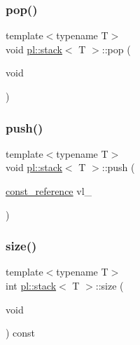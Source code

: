 \mbox{\label{classpl_1_1stack_aee95f572e71eeebc97a4d5543d500886}} 
\subsubsection{\texorpdfstring{pop()}{pop()}}
{\footnotesize\ttfamily template$<$typename T$>$ \\
void \hyperlink{classpl_1_1stack}{pl\+::stack}$<$ T $>$\+::pop (\begin{DoxyParamCaption}\item[{void}]{ }\end{DoxyParamCaption})\hspace{0.3cm}{\ttfamily [inline]}}

\mbox{\label{classpl_1_1stack_ab4c99a438c4dd0da57c162da9d08d184}} 
\subsubsection{\texorpdfstring{push()}{push()}}
{\footnotesize\ttfamily template$<$typename T$>$ \\
void \hyperlink{classpl_1_1stack}{pl\+::stack}$<$ T $>$\+::push (\begin{DoxyParamCaption}\item[{\hyperlink{classpl_1_1stack_a9474b23cf6fa5332f22fc06852e2d6d5}{const\+\_\+reference}}]{vl\+\_\+ }\end{DoxyParamCaption})\hspace{0.3cm}{\ttfamily [inline]}}

\mbox{\label{classpl_1_1stack_a51d32715600434c7e979c271d298b63c}} 
\subsubsection{\texorpdfstring{size()}{size()}}
{\footnotesize\ttfamily template$<$typename T$>$ \\
int \hyperlink{classpl_1_1stack}{pl\+::stack}$<$ T $>$\+::size (\begin{DoxyParamCaption}\item[{void}]{ }\end{DoxyParamCaption}) const\hspace{0.3cm}{\ttfamily [inline]}}

